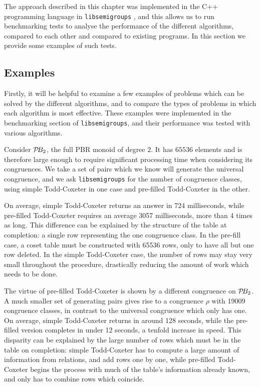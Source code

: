 The approach described in this chapter was implemented in the C++ programming
language in \texttt{libsemigroups} \cite{libsemigroups}, and this allows us to
run benchmarking tests to analyse the performance of the different algorithms,
compared to each other and compared to existing programs.  In this section we
provide some examples of such tests.

\subsection{Examples}
Firstly, it will be helpful to examine a few examples of problems which can be
solved by the different algorithms, and to compare the types of problems in
which each algorithm is most effective.  These examples were implemented in the
benchmarking section of \texttt{libsemigroups}, and their performance was tested
with various algorithms.

\begin{example}
  \label{ex:good-tc}
  Consider $\mathcal{P}\!B_2$, the full PBR monoid of degree $2$.  It has $65536$ elements
  and is therefore large enough to require significant processing time when
  considering its congruences.   We take a set of pairs which we know will
  generate the universal congruence, and we ask \texttt{libsemigroups} for the
  number of congruence classes, using simple Todd-Coxeter in one case and
  pre-filled Todd-Coxeter in the other.

  On average, simple Todd-Coxeter returns an answer in 724 milliseconds, while
  pre-filled Todd-Coxeter requires an average 3057 milliseconds, more than 4
  times as long.  This difference can be explained by the structure
  of the table at completion: a single row representing the one congruence
  class.  In the pre-fill case, a coset table must be constructed with 65536
  rows, only to have all but one row deleted.  In the simple Todd-Coxeter case,
  the number of rows may stay very small throughout the procedure, drastically
  reducing the amount of work which needs to be done.
\end{example}

\begin{example}
  \label{ex:good-tc-prefill}
  The virtue of pre-filled Todd-Coxeter is shown by a different congruence on
  $\mathcal{P}\!B_2$.  A much smaller set of generating pairs gives rise to a congruence
  $\rho$ with 19009 congruence classes, in contrast to the universal congruence
  which only has one.  On average, simple Todd-Coxeter returns in around 128
  seconds, while the pre-filled version completes in under 12 seconds, a tenfold
  increase in speed.  This disparity can be explained by the large number of
  rows which must be in the table on completion: simple Todd-Coxeter has to
  compute a large amount of information from relations, and add rows one by one,
  while pre-filled Todd-Coxeter begins the process with much of the table's
  information already known, and only has to combine rows which coincide.
\end{example}

